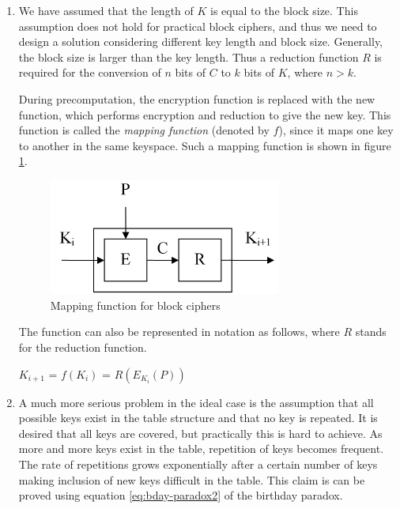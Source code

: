 \begin{enumerate}

\item We have assumed that the length of $K$ is equal to the block size. This assumption does not hold for practical block ciphers, and thus we need to design a solution considering different key length and block size. Generally, the block size is larger than the key length. Thus a reduction function $R$ is required for the conversion of $n$ bits of $C$ to $k$ bits of $K$, where $n > k$. 


During precomputation, the encryption function is replaced with the new function, which performs encryption and reduction to give the new key. This function is called the \emph{mapping function} (denoted by $f$), since it maps one key to another in the same keyspace. Such a mapping function is shown in figure \ref{fig:mapping-function}. 

\begin{figure}[ht!]
	\centering
		\includegraphics[width=3in]{./figures/mapping-function.PNG}
	\caption{Mapping function for block ciphers}	
	\label{fig:mapping-function}
\end{figure}

The function can also be represented in notation as follows, where $R$ stands for the reduction function.

\begin{center}
$K_{i+1}$ = $f(K_i)$ = $R(E_{K_i}(P))$\\
\end{center}

\item A much more serious problem in the ideal case is the assumption that all possible keys exist in the table structure and that no key is repeated. It is desired that all keys are covered, but practically this is hard to achieve. As more and more keys exist in the table, repetition of keys becomes frequent. The rate of repetitions grows exponentially after a certain number of keys making inclusion of new keys difficult in the table. This claim is can be proved using equation \ref{eq:bday-paradox2} of the birthday paradox.


\end{enumerate}
